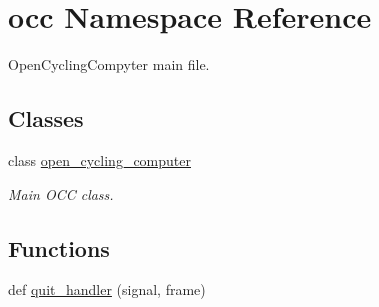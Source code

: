 \hypertarget{namespaceocc}{}\section{occ Namespace Reference}
\label{namespaceocc}


Open\+Cycling\+Compyter main file.  


\subsection*{Classes}
\begin{DoxyCompactItemize}
\item 
class \hyperlink{classocc_1_1open__cycling__computer}{open\+\_\+cycling\+\_\+computer}
\begin{DoxyCompactList}\small\item\em Main O\+CC class. \end{DoxyCompactList}\end{DoxyCompactItemize}
\subsection*{Functions}
\begin{DoxyCompactItemize}
\item 
def \hyperlink{namespaceocc_aed13b1dbf264ee7a7f3a0fd08f9a054a}{quit\+\_\+handler} (signal, frame)
\end{DoxyCompactItemize}
